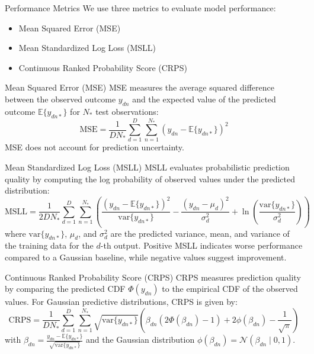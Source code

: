 \begin{frame}{Performance Metrics}
	We use three metrics to evaluate model performance:
	\begin{itemize}
		\item Mean Squared Error (MSE)
		\item Mean Standardized Log Loss (MSLL)
		\item Continuous Ranked Probability Score (CRPS)
	\end{itemize}
\end{frame}

\begin{frame}{Mean Squared Error (MSE)}
	MSE measures the average squared difference between the observed outcome $y_{dn}$ and the expected value of the predicted outcome $\mathbb{E}\{y_{dn*}\}$ for $N_*$ test observations:
	\begin{equation*}\label{eq:mse}
		\text{MSE} = \frac{1}{DN_{*}} \sum_{d=1}^{D} \sum_{n=1}^{N_*} (y_{dn} - \mathbb{E}\{y_{dn*}\})^2
	\end{equation*}
	MSE does not account for prediction uncertainty.
\end{frame}

\begin{frame}{Mean Standardized Log Loss (MSLL)}
	MSLL evaluates probabilistic prediction quality by computing the log probability of observed values under the predicted distribution:
	\begin{equation*}
		\text{MSLL} = \frac{1}{2DN_{*}} \sum_{d=1}^{D} \sum_{n=1}^{N_*} \left( \frac{(y_{dn} - \mathbb{E}\{y_{dn*}\})^2}{\text{var}\{y_{dn*}\}} - \frac{(y_{dn} - \mu_d)^2}{\sigma_d^2} + \ln \left(\frac{\text{var}\{y_{dn*}\}}{\sigma_d^2}\right) \right)
	\end{equation*}
		where $\text{var}\{y_{dn*}\}$, $\mu_d$, and $\sigma_d^2$ are the predicted variance, mean, and variance of the training data for the $d$-th output. Positive MSLL indicates worse performance compared to a Gaussian baseline, while negative values suggest improvement.
\end{frame}

\begin{frame}{Continuous Ranked Probability Score (CRPS)}
	CRPS measures prediction quality by comparing the predicted CDF $\Phi(y_{dn})$ to the empirical CDF of the observed values. For Gaussian predictive distributions, CRPS is given by:
	\begin{equation*}
		\text{CRPS} = \frac{1}{DN_*} \sum_{d=1}^{D} \sum_{n=1}^{N_*} \sqrt{\text{var}\{y_{dn*}\}} \left(\beta_{dn} \left( 2\Phi\left(\beta_{dn}\right) - 1 \right) + 2\phi\left(\beta_{dn}\right) - \frac{1}{\sqrt{\pi}} \right)
	\end{equation*}
	with $\beta_{dn} = \frac{y_{dn} - \mathbb{E}\{y_{dn*}\}}{\sqrt{\text{var}\{y_{dn*}\}}}$ and the Gaussian distribution $\phi(\beta_{dn})=\mathcal{N}(\beta_{dn}\mid 0,1)$.
\end{frame}


